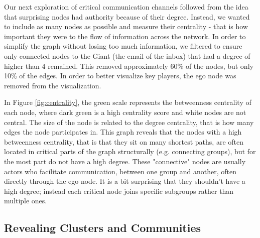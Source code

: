 \documentclass[11pt,letterpaper]{article}
\begin{document}
Our next exploration of critical communication channels followed from the idea that surprising nodes had authority because of their degree. Instead, we wanted to include as many nodes as possible and measure their centrality - that is how important they were to the flow of information across the network. In order to simplify the graph without losing too much information, we filtered to ensure only connected nodes to the Giant (the email of the inbox) that had a degree of higher than 4 remained. This removed approximately 60\% of the nodes, but only 10\% of the edges. In order to better visualize key players, the ego node was removed from the visualization.

In Figure \ref{fig:centrality}, the green scale represents the betweenness centrality of each node, where dark green is a high centrality score and white nodes are not central. The size of the node is related to the degree centrality, that is how many edges the node participates in. This graph reveals that the nodes with a high betweenness centrality, that is that they sit on many shortest paths, are often located in critical parts of the graph structurally (e.g. connecting groups), but for the most part do not have a high degree. These "connective" nodes are usually actors who facilitate communication, between one group and another, often directly through the ego node. It is a bit surprising that they shouldn't have a high degree; instead each critical node joins specific subgroups rather than multiple ones.

\subsection*{Revealing Clusters and Communities}
\end{document}
